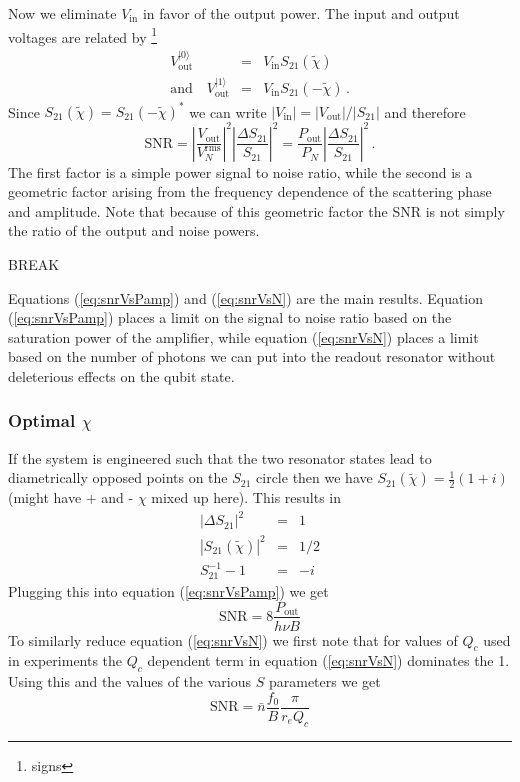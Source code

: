 Now we eliminate $V_{\textrm{in}}$ in favor of the output power. The input and output voltages are related by \footnote{signs} \begin{eqnarray}
V_{\textrm{out}}^{|0\rangle} &=& V_{\textrm{in}} S_{21}(\tilde{\chi}) \nonumber \\
\textrm{and} \quad V_{\textrm{out}}^{|1\rangle} &=& V_{\textrm{in}} S_{21}(-\tilde{\chi})\, . \nonumber \end{eqnarray}
Since $S_{21}(\tilde{\chi}) = S_{21}(-\tilde{\chi})^*$ we can write $|V_\textrm{in}|=|V_{\textrm{out}}|/|S_{21}|$ and therefore \begin{equation}
\textrm{SNR} = \left| \frac{V_{\textrm{out}}}{V_N^{\textrm{rms}}} \right| ^2 \left| \frac{\Delta S_{21}}{S_{21}} \right| ^2 = \frac{P_{\textrm{out}}}{P_N} \left| \frac{\Delta S_{21}}{S_{21}} \right|^2 \, . \end{equation}
The first factor is a simple power signal to noise ratio, while the second is a geometric factor arising from the frequency dependence of the scattering phase and amplitude. Note that because of this geometric factor the SNR is not simply the ratio of the output and noise powers.

BREAK

Equations (\ref{eq:snrVsPamp}) and (\ref{eq:snrVsN}) are the main results. Equation (\ref{eq:snrVsPamp}) places a limit on the signal to noise ratio based on the saturation power of the amplifier, while equation (\ref{eq:snrVsN}) places a limit based on the number of photons we can put into the readout resonator without deleterious effects on the qubit state.

\subsubsection{Optimal $\chi$}

If the system is engineered such that the two resonator states lead to diametrically opposed points on the $S_{21}$ circle then we have $S_{21}(\tilde{\chi}) = \frac{1}{2}(1+i)$ (might have + and - $\chi$ mixed up here). This results in \begin{eqnarray*}
|\Delta S_{21}|^2 &=& 1 \\
|S_{21}(\tilde{\chi})|^2 &=& 1/2 \\
S_{21}^{-1} - 1 &=& -i \end{eqnarray*}
Plugging this into equation (\ref{eq:snrVsPamp}) we get \begin{equation}
\textrm{SNR} = 8 \frac{P_{\textrm{out}}}{h\nu B} \end{equation}
To similarly reduce equation (\ref{eq:snrVsN}) we first note that for values of $Q_c$ used in experiments the $Q_c$ dependent term in equation (\ref{eq:snrVsN}) dominates the 1. Using this and the values of the various $S$ parameters we get \begin{equation}
\textrm{SNR} = \bar{n} \frac{f_0}{B}\frac{\pi}{r_e Q_c} \end{equation}


